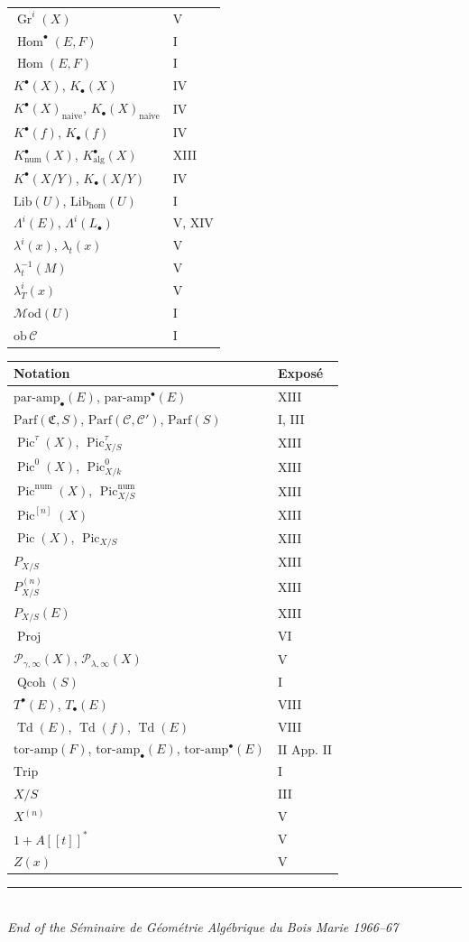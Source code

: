 \documentclass[12pt]{article}
\newcommand{\Pic}{\operatorname{Pic}}
\newcommand{\Proj}{\operatorname{Proj}}
\newcommand{\Gr}{\operatorname{Gr}}
\newcommand{\Todd}{\operatorname{Td}}
\newcommand{\Td}{\operatorname{Td}}
\newcommand{\Hom}{\operatorname{Hom}}
\newcommand{\num}{\mathrm{num}}
\begin{document}
\begin{longtable}{p{7.5cm}l}
$\Gr^i(X)$ & V\\
$\Hom^\bullet(E,F)$ & I\\
$\Hom(E,F)$ & I\\
$K^\bullet(X)$, $K_\bullet(X)$ & IV\\
$K^\bullet(X)_{\mathrm{naive}}$, $K_\bullet(X)_{\mathrm{naive}}$ & IV\\
$K^\bullet(f)$, $K_\bullet(f)$ & IV\\
$K^\bullet_{\mathrm{num}}(X)$, $K^\bullet_{\mathrm{alg}}(X)$ & XIII\\
$K^\bullet(X/Y)$, $K_\bullet(X/Y)$ & IV\\
$\mathrm{Lib}(U)$, $\mathrm{Lib}_{\mathrm{hom}}(U)$ & I\\
$\Lambda^i(E)$, $\Lambda^i(L_\bullet)$ & V, XIV\\
$\lambda^i(x)$, $\lambda_t(x)$ & V\\
$\lambda_t^{-1}(M)$ & V\\
$\lambda_T^i(x)$ & V\\
$\mathcal M\mathrm{od}(U)$ & I\\
$\mathrm{ob}\,\mathcal C$ & I\\
\bottomrule
\end{longtable}

\begin{longtable}{p{7.5cm}l}
\toprule
\textbf{Notation} & \textbf{Exposé}\\
\midrule
\endhead
$\mathrm{par\text{-}amp}_\bullet(E)$, $\mathrm{par\text{-}amp}^\bullet(E)$ & XIII\\
$\mathrm{Parf}(\mathfrak C,S)$, $\mathrm{Parf}(\mathcal C,\mathcal C')$, $\mathrm{Parf}(S)$ & I, III\\
$\Pic^\tau(X)$, $\Pic^\tau_{X/S}$ & XIII\\
$\Pic^0(X)$, $\Pic^0_{X/k}$ & XIII\\
$\Pic^{\num}(X)$, $\Pic^{\num}_{X/S}$ & XIII\\
$\Pic^{[n]}(X)$ & XIII\\
$\Pic(X)$, $\Pic_{X/S}$ & XIII\\
$P_{X/S}$ & XIII\\
$P_{X/S}^{(n)}$ & XIII\\
$P_{X/S}(E)$ & XIII\\
$\Proj$ & VI\\
$\mathcal P_{\gamma,\infty}(X)$, $\mathcal P_{\lambda,\infty}(X)$ & V\\
$\operatorname{Qcoh}(S)$ & I\\
$T^\bullet(E)$, $T_\bullet(E)$ & VIII\\
$\Todd(E)$, $\Todd(f)$, $\Td(E)$ & VIII\\
$\mathrm{tor\text{-}amp}(F)$, $\mathrm{tor\text{-}amp}_\bullet(E)$, $\mathrm{tor\text{-}amp}^\bullet(E)$ & II App. II\\
$\mathrm{Trip}$ & I\\
$X/S$ & III\\
$X^{(n)}$ & V\\
$1+A[[t]]^*$ & V\\
$Z(x)$ & V\\
\bottomrule
\end{longtable}

\begin{center}
\rule{0.5\textwidth}{0.4pt}\\[0.5em]
\textit{End of the Séminaire de Géométrie Algébrique du Bois Marie 1966--67}
\end{center}
\end{document}
